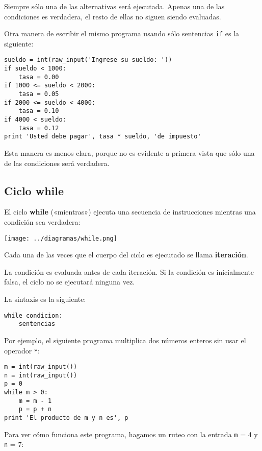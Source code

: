 Siempre sólo una de las alternativas será ejecutada. Apenas una de las
condiciones es verdadera, el resto de ellas no siguen siendo evaluadas.

Otra manera de escribir el mismo programa usando sólo sentencias
\lstinline!if! es la siguiente:

\begin{lstlisting}
sueldo = int(raw_input('Ingrese su sueldo: '))
if sueldo < 1000:
    tasa = 0.00
if 1000 <= sueldo < 2000:
    tasa = 0.05
if 2000 <= sueldo < 4000:
    tasa = 0.10
if 4000 < sueldo:
    tasa = 0.12
print 'Usted debe pagar', tasa * sueldo, 'de impuesto'
\end{lstlisting}

Esta manera es menos clara, porque no es evidente a primera vista que
sólo una de las condiciones será verdadera.

\subsection{Ciclo while}

El ciclo \textbf{while} («mientras») ejecuta una secuencia de
instrucciones mientras una condición sea verdadera:

\texttt{[image: ../diagramas/while.png]}

Cada una de las veces que el cuerpo del ciclo es ejecutado se llama
\textbf{iteración}.

La condición es evaluada antes de cada iteración. Si la condición es
inicialmente falsa, el ciclo no se ejecutará ninguna vez.

La sintaxis es la siguiente:

\begin{lstlisting}
while condicion:
    sentencias
\end{lstlisting}

Por ejemplo, el siguiente programa multiplica dos números enteros sin
usar el operador \lstinline!*!:

\begin{lstlisting}
m = int(raw_input())
n = int(raw_input())
p = 0
while m > 0:
    m = m - 1
    p = p + n
print 'El producto de m y n es', p
\end{lstlisting}

Para ver cómo funciona este programa, hagamos un ruteo con la entrada
\lstinline!m! = 4 y \lstinline!n! = 7:

